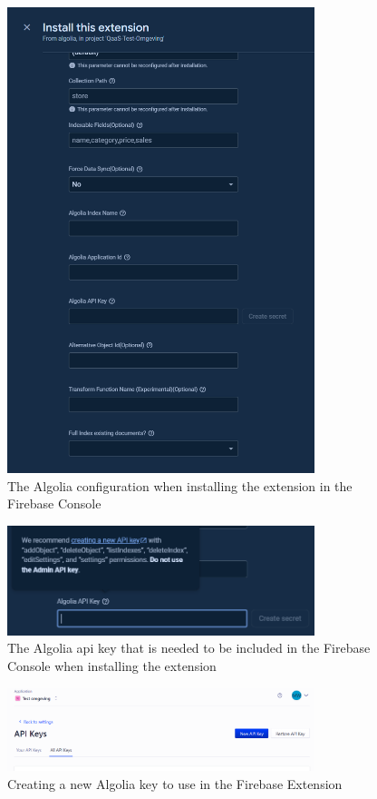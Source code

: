 \begin{figure}[htbp]
  \centering
  \includegraphics[width=0.8\textwidth]{Figures/Firebase Algolia Extension.png}
  \caption{The Algolia configuration when installing the extension in the Firebase Console}
\end{figure}

\begin{figure}[htbp]
  \centering
  \includegraphics[width=0.8\textwidth]{Figures/Algolia API Key needed.png}
  \caption{The Algolia \acrshort{api} key that is needed to be included in the Firebase Console when installing the extension}
\end{figure}

\begin{figure}[htbp]
  \centering
  \includegraphics[width=0.8\textwidth]{Figures/Create new Algolia keys.png}
  \caption{Creating a new Algolia key to use in the Firebase Extension}
\end{figure}


